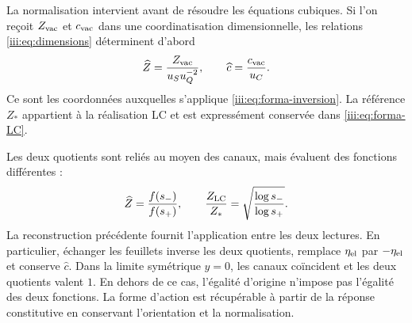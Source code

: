 La normalisation intervient avant de résoudre les équations cubiques.
Si l’on reçoit $Z_{\rm vac}$ et $c_{\rm vac}$ dans une coordinatisation dimensionnelle,
les relations \eqref{iii:eq:dimensions} déterminent d’abord
\[
 \widehat Z=\frac{Z_{\rm vac}}{u_Su_Q^{-2}},\qquad
 \widehat c=\frac{c_{\rm vac}}{u_C}.
\]
Ce sont les coordonnées auxquelles s'applique \eqref{iii:eq:forma-inversion}. La référence $Z_*$ appartient à la réalisation LC et est expressément conservée dans \eqref{iii:eq:forma-LC}.

Les deux quotients sont reliés au moyen des canaux, mais évaluent
des fonctions différentes :
\begin{equation}
 \widehat Z=\frac{f(s_-)}{f(s_+)},\qquad
 \frac{Z_{\rm LC}}{Z_*}
       =\sqrt{\frac{\log s_-}{\log s_+}}.
 \label{iii:eq:forma-dos-cocientes}
\end{equation}
La reconstruction précédente fournit l'application entre les deux lectures. En particulier, échanger les feuillets inverse les deux quotients, remplace $\eta_{\rm el}$ par $-\eta_{\rm el}$ et conserve $\widehat c$. Dans la limite symétrique $y=0$, les canaux coïncident et les deux quotients valent $1$. En dehors de ce cas, l'égalité d'origine n'impose pas l'égalité des deux fonctions. La forme d'action est récupérable à partir de la réponse constitutive en conservant l'orientation et la normalisation.
